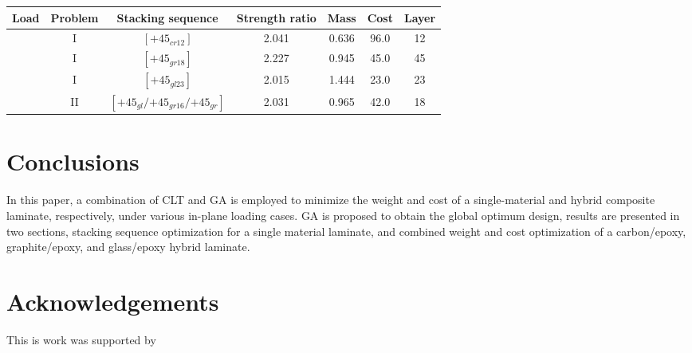 \documentclass[smallextended]{svjour3}       %
\begin{document}
\begin{center}
\begin{tabular}{ccccccc}
	\toprule
	Load                                                    &   Problem          & Stacking sequence                          & Strength ratio  & Mass &  Cost   & Layer    \\
	\midrule
	  &      I   &  $[\text{+}45_{cr12}]$                            & 2.041           & 0.636 &  96.0  & 12  \\
													    						  &      I   &  $[\text{+}45_{gr18}]$                            & 2.227           & 0.945 &  45.0  & 45  \\
			 &  I                  &  $[\text{+}45_{gl23}]$                            & 2.015           & 1.444 &  23.0  & 23  \\
			 &  II                 &  $[\text{+}45_{gl}/\text{+}45_{gr16}/\text{+}45_{gr}]$          & 2.031           & 0.965 &  42.0  & 18 \\
	\bottomrule
\end{tabular}
\end{center}




\section{Conclusions}
In this paper, a combination of CLT and GA is employed to minimize the weight
and cost of a single-material and hybrid composite laminate, respectively,
under various in-plane loading cases. GA is proposed to obtain the global
optimum design, results are presented in two sections, stacking sequence
optimization for a single material laminate, and combined weight and cost
optimization of a carbon/epoxy, graphite/epoxy, and glass/epoxy hybrid
laminate.

\section{Acknowledgements}
This is work was supported by 






\end{document}

